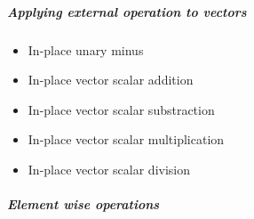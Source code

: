 \subparagraph{Applying external operation to vectors}

\begin{itemize}
\item {}
  \sshortdescribe In-place unary minus
\item {}
  \sshortdescribe In-place vector scalar addition  
\item {}
  \sshortdescribe In-place vector scalar substraction  
\item {}
  \sshortdescribe In-place vector scalar multiplication  
\item {}
  \sshortdescribe In-place vector scalar division  
\end{itemize}

\subparagraph{Element wise operations}

